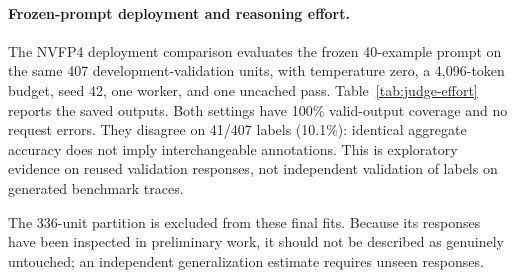 \paragraph{Frozen-prompt deployment and reasoning effort.}
The NVFP4 deployment comparison evaluates the frozen 40-example prompt
on the same 407 development-validation units, with temperature zero,
a 4,096-token budget, seed 42, one worker, and one uncached pass.
Table~\ref{tab:judge-effort} reports the saved outputs. Both settings have
100\% valid-output coverage and no request errors. They disagree on 41/407
labels (10.1\%): identical aggregate accuracy does not imply interchangeable
annotations. This is exploratory evidence on reused validation responses,
not independent validation of labels on generated benchmark traces.


The 336-unit partition is excluded from these final fits. Because its
responses have been inspected in preliminary work, it should not be
described as genuinely untouched; an independent generalization estimate
requires unseen responses.
